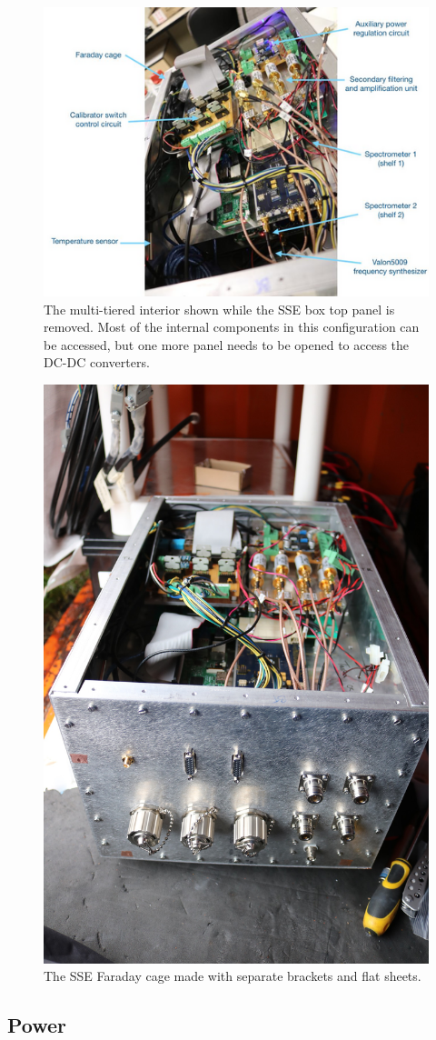 \begin{figure}
	\centering
	\includegraphics[width=\linewidth]{Figures/enclosure_ann}
	\caption{The multi-tiered interior shown while the SSE box top panel is removed. Most of the internal components in this configuration can be accessed, but one more panel needs to be opened to access the DC-DC converters.}
	\label{Fig:enclosure_ann}
\end{figure}

\begin{figure}
	\centering
	\includegraphics[width=0.4\linewidth]{Figures/47093285614_63bb00be20_o}
	\caption{The SSE Faraday cage made with separate brackets and flat sheets.}
	\label{Fig:47093285614_63bb00be20_o}
\end{figure}       

\subsection{Power}

